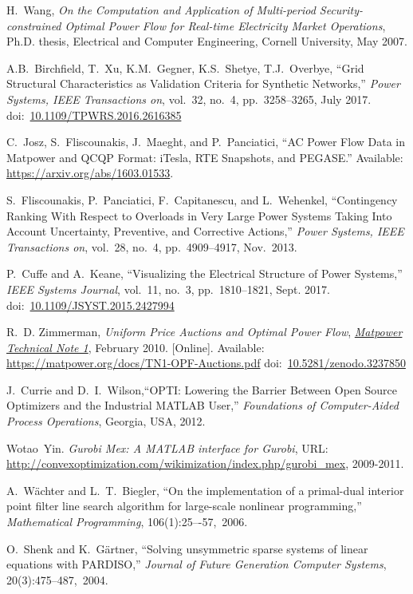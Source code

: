 \documentclass[12pt]{article}
\newcommand{\matpower}[0]{{\sc Matpower}}
\newcommand{\TNoneurl}[0]{https://matpower.org/docs/TN1-OPF-Auctions.pdf}
\newcommand{\TNone}[0]{\href{\TNoneurl}{\it \matpower{} Technical Note 1}}
\newcommand{\doi}[1]{doi:~\href{https://doi.org/#1}{#1}}
\numberwithin{equation}{section}
\numberwithin{table}{section}
\numberwithin{figure}{section}
\begin{document}
\begin{thebibliography}{99}
H.~Wang, \emph{On the Computation and Application of Multi-period Security-constrained Optimal Power Flow for Real-time Electricity Market Operations}, Ph.D. thesis, Electrical and Computer Engineering, Cornell University, May 2007.

A.B.~Birchfield, T.~Xu, K.M.~Gegner, K.S.~Shetye, T.J.~Overbye,
``Grid Structural Characteristics as Validation Criteria for Synthetic Networks,''  \emph{Power Systems, IEEE Transactions on}, vol.~32, no.~4, pp.~3258--3265, July 2017.
\doi{10.1109/TPWRS.2016.2616385}

C.~Josz, S.~Fliscounakis, J.~Maeght, and P.~Panciatici, ``AC Power
Flow Data in \matpower{} and QCQP Format: iTesla, RTE Snapshots, and PEGASE.''
Available: \url{https://arxiv.org/abs/1603.01533}.

S.~Fliscounakis, P.~Panciatici, F.~Capitanescu, and L.~Wehenkel, ``Contingency Ranking With Respect to Overloads in Very Large Power Systems Taking Into Account Uncertainty, Preventive, and Corrective Actions,'' \emph{Power Systems, IEEE Transactions on}, vol.~28, no.~4, pp.~4909--4917, Nov.~2013.

P.~Cuffe and A.~Keane, ``Visualizing the Electrical Structure of Power Systems,'' \emph{IEEE Systems Journal}, vol.~11, no.~3, pp.~1810--1821, Sept. 2017.
\doi{10.1109/JSYST.2015.2427994}

R.~D. Zimmerman, \emph{Uniform Price Auctions and Optimal Power Flow}, \TNone, February 2010. [Online]. Available: \url{\TNoneurl}
\doi{10.5281/zenodo.3237850}

J.~Currie and D.~I.~Wilson,``OPTI: Lowering the Barrier Between Open Source Optimizers and the Industrial MATLAB User,'' \emph{Foundations of Computer-Aided Process Operations}, Georgia, USA, 2012.

Wotao~Yin. \emph{Gurobi Mex: A MATLAB interface for Gurobi}, URL: \url{http://convexoptimization.com/wikimization/index.php/gurobi_mex}, 2009-2011.

A.~W\"achter and L.~T.~Biegler, ``On the implementation of a primal-dual interior point filter line search algorithm for large-scale nonlinear programming,'' \emph{Mathematical Programming}, 106(1):25–-57,~2006.

O.~Shenk and K.~G\"artner, ``Solving unsymmetric sparse systems of linear equations with PARDISO,'' \emph{Journal of Future Generation Computer Systems}, 20(3):475--487,~2004.


\end{thebibliography}
\end{document}
